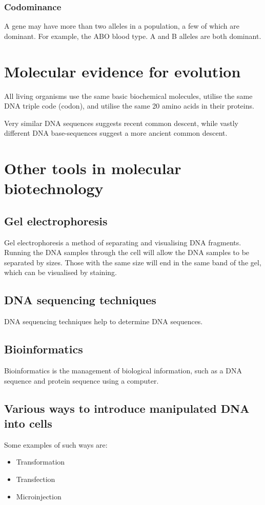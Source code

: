 \documentclass[11pt]{article}
\begin{document}
\subsubsection{Codominance}
\label{sec:org552cee7}
A gene may have more than two alleles in a population, a few of which are dominant. For example, the ABO blood type. A and B alleles are both dominant.
\section{Molecular evidence for evolution}
\label{sec:orgd4cd607}
All living organisms use the same basic biochemical molecules, utilise the same DNA triple code (codon), and utilise the same 20 amino acids in their proteins.


Very similar DNA sequences suggests recent common descent, while vastly different DNA base-sequences suggest a more ancient common descent.
\section{Other tools in molecular biotechnology}
\label{sec:orgc0b29c4}

\subsection{Gel electrophoresis}
\label{sec:orgb4ad9d0}
Gel electrophoresis a method of separating and visualising DNA fragments. Running the DNA samples through the cell will allow the DNA samples to be separated by sizes. Those with the same size will end in the same band of the gel, which can be visualised by staining.
\subsection{DNA sequencing techniques}
\label{sec:orgd1004f0}
DNA sequencing techniques help to determine DNA sequences.
\subsection{Bioinformatics}
\label{sec:org19e3b86}
Bioinformatics is the management of biological information, such as a DNA sequence and protein sequence using a computer.
\subsection{Various ways to introduce manipulated DNA into cells}
\label{sec:orge5cf1ed}
Some examples of such ways are:
\begin{itemize}
\item Transformation
\item Transfection
\item Microinjection
\end{itemize}
\end{document}
